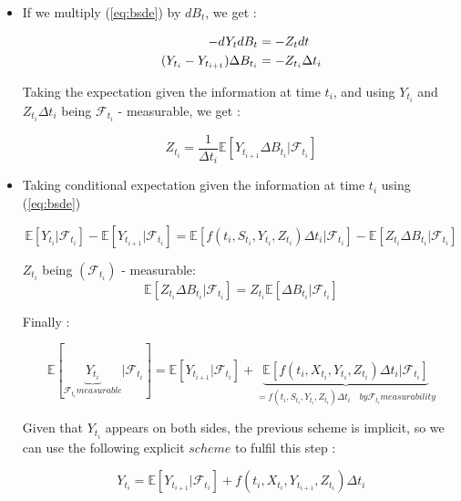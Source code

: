 \documentclass[english,11pt,openany]{report}
\theoremstyle{definition}
\theoremstyle{plain}
\theoremstyle{definition}
\begin{document}
\begin{itemize}
	\item 
If we multiply (\ref{eq:bsde}) by $dB_t$, we get : 

\begin{align}
- dY_tdB_t & = - Z_tdt \notag \\
(Y_{t_i} - Y_{t_{i + 1}}) \Delta B_{t_i} & =- Z_{t_i}\Delta t_i \notag 
\end{align}

Taking the expectation given the information at time $t_i$, and using  
$Y_{t_i}$ and $Z_{t_i}\Delta t_i$ being $\mathcal{F}_{t_i}$ - measurable, 
we get : 

\begin{displaymath}
Z_{t_i} = \frac{1}{\Delta t_i}\mathbb{E}[Y_{t_{i + 1}} \Delta B_{t_i}  | \mathcal{F}_{t_i}]
\end{displaymath}


\item 

Taking conditional expectation given the information at time $t_i$ using (\ref{eq:bsde}) 

\begin{displaymath}
\mathbb{E}[Y_{t_i}| \mathcal{F}_{t_i}] - \mathbb{E}[Y_{t_{i + 1}} | \mathcal{F}_{t_i}] = \mathbb{E}[f(t_i,S_{t_i}, Y_{t_i}, Z_{t_i})\Delta t_i| \mathcal{F}_{t_i}] -\mathbb{E}[Z_{t_i}\Delta B_{t_i}| \mathcal{F}_{t_i}]
\end{displaymath}

$Z_{t_i}$ being $(\mathcal{F}_{t_i})$ - measurable: 
\begin{displaymath}
\mathbb{E}[Z_{t_i}\Delta B_{t_i}| \mathcal{F}_{t_i}] = Z_{t_i}\mathbb{E}[\Delta B_{t_i}| \mathcal{F}_{t_i}]
\end{displaymath}

Finally : 

\begin{displaymath}
\mathbb{E}[\underbrace{Y_{t_i}}_{\mathcal{F}_{t_i} measurable}| \mathcal{F}_{t_i}] = \mathbb{E}[Y_{t_{i + 1}} | \mathcal{F}_{t_i}] +  \underbrace{\mathbb{E}[f(t_i,X_{t_i}, Y_{t_i}, Z_{t_i})\Delta t_i| \mathcal{F}_{t_i}]}_{= f(t_i,S_{t_i}, Y_{t_i}, Z_{t_i})\Delta t_i \quad by \mathcal{F}_{t_i} measurability}
\end{displaymath}

Given that $Y_{t_i}$ appears on both sides, the previous scheme is implicit, so we can use the following explicit $scheme$ to fulfil this step : 

\begin{displaymath}
Y_{t_i} = \mathbb{E}[Y_{t_{i + 1}} | \mathcal{F}_{t_i}] +  f(t_i,X_{t_i}, Y_{t_{i + 1}}, Z_{t_i})\Delta t_i
\end{displaymath}

\end{itemize}
\end{document}
